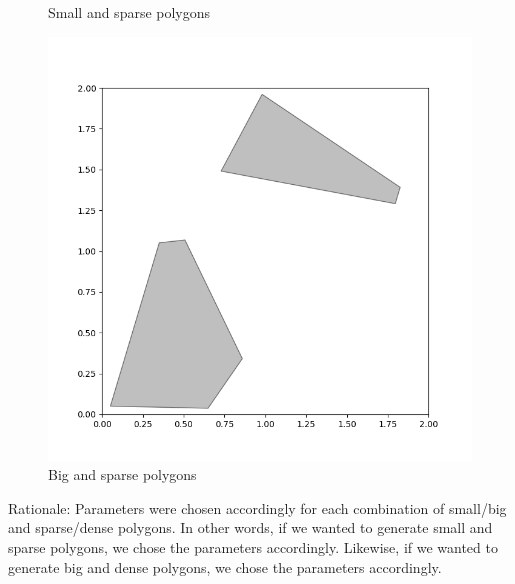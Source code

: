 \documentclass{article}
\begin{document}
\begin{figure}[htbp]
\begin{minipage}{0.45\textwidth}
    \caption{Small and sparse polygons}
  \end{minipage}\hfill
  \begin{minipage}{0.45\textwidth}
    \includegraphics[width=\linewidth]{part1_big_sparse.png}
    \caption{Big and sparse polygons}
  \end{minipage}
\end{figure}

Rationale: Parameters were chosen accordingly for each combination of small/big and sparse/dense polygons. In other words, if we wanted to generate small and sparse polygons, we chose the parameters accordingly. Likewise, if we wanted to generate big and dense polygons, we chose the parameters accordingly. 
\end{document}
